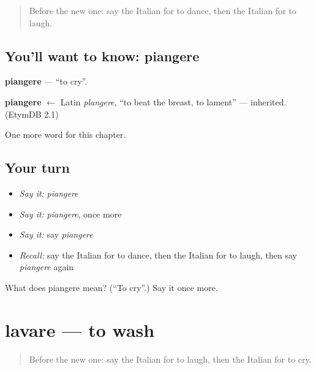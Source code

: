 \label{lesson:IT-C47-piangere}



\begin{quote}
Before the new one: say the Italian for to dance, then the Italian for to laugh.
\end{quote}

\subsection*{You'll want to know: piangere}
\textbf{piangere} — \textquotedblleft{}to cry\textquotedblright{}.

\begin{cousinweb}
\textbf{piangere} $\leftarrow$ Latin \emph{plangere}, \textquotedblleft{}to beat the breast, to lament\textquotedblright{} — inherited. (EtymDB 2.1)
\end{cousinweb}

\begin{grammarlens}[title={What you've built}]
One more word for this chapter.
\end{grammarlens}

\subsection*{Your turn}
\begin{itemize}
\raggedright
  \item \emph{Say it:} \emph{piangere}
  \item \emph{Say it:} \emph{piangere}, once more
  \item \emph{Say it:} say \emph{piangere}
  \item \emph{Recall:} say the Italian for to dance, then the Italian for to laugh, then say \emph{piangere} again
\end{itemize}

\begin{tcolorbox}[breakable,colback=teal!4,colframe=teal!35!black,title={Before you move on}]
What does piangere mean? (\textquotedblleft{}To cry\textquotedblright{}.) Say it once more.
\end{tcolorbox}
\section[lavare]{lavare — to wash}

\label{lesson:IT-C47-lavare}



\begin{quote}
Before the new one: say the Italian for to laugh, then the Italian for to cry.
\end{quote}

